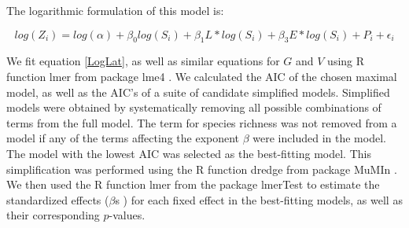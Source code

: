 \documentclass[12pt]{article}
\begin{document}
The logarithmic formulation of this model is:

\begin{equation}
\label{LogLat}
log(Z_{i})= log(\alpha)+\beta_{0}log(S_{i}) + \beta_{1}L*log(S_{i}) +\beta_{3}E*log(S_{i})+ P_{i} +\epsilon_{i}
\end{equation}


We fit equation \ref{LogLat}, as well as similar equations for $G$ and $V$ using R \citep{R} function lmer from package lme4
\citep{lmerTest}.
We calculated the AIC of the chosen maximal model, as well as the AIC's of a suite of candidate simplified models.
Simplified models were obtained by systematically removing all possible combinations of terms from the full model.
The term for species richness was not removed from a model if any of the terms affecting the exponent $\beta$ were 
included in the model. The model with the lowest AIC was selected as the best-fitting model. 
This simplification was performed using the
R \citep{R} function dredge from package MuMIn \citep{MuMIn}. We then used the R \citep{R} function lmer
from the package lmerTest \citep{lmerTest} to estimate the standardized effects ($\beta$s ) for each fixed effect in the 
best-fitting models, as well as their corresponding $p$-values. 



\end{document}

